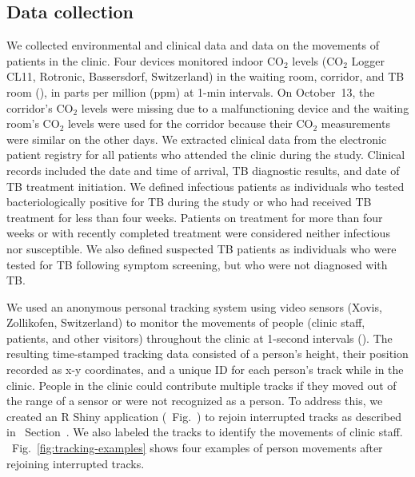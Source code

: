 \documentclass[fleqn,11pt]{wlscirep}
\begin{document}
\subsection*{Data collection}

We collected environmental and clinical data and data on the movements of patients in the clinic. Four devices monitored indoor CO$_2$ levels (CO$_2$ Logger CL11, Rotronic, Bassersdorf, Switzerland) in the waiting room, corridor, and TB room (), in parts per million (ppm) at 1-min intervals. On October~13, the corridor's CO$_2$ levels were missing due to a malfunctioning device and the waiting room's CO$_2$ levels were used for the corridor because their CO$_2$ measurements were similar on the other days.    
We extracted clinical data from the electronic patient registry for all patients who attended the clinic during the study. Clinical records included the date and time of arrival, TB diagnostic results, and date of TB treatment initiation. We defined infectious patients as individuals who tested bacteriologically positive for TB during the study or who had received TB treatment for less than four weeks. Patients on treatment for more than four weeks or with recently completed treatment were considered neither infectious nor susceptible. We also defined suspected TB patients as individuals who were tested for TB following symptom screening, but who were not diagnosed with TB. 

We used an anonymous personal tracking system using video sensors (Xovis, Zollikofen, Switzerland) to monitor the movements of people (clinic staff, patients, and other visitors) throughout the clinic at 1-second intervals (). The resulting time-stamped tracking data consisted of a person’s height, their position recorded as x-y coordinates, and a unique ID for each person's track while in the clinic. People in the clinic could contribute multiple tracks if they moved out of the range of a sensor or were not recognized as a person. To address this, we created an R Shiny application (\supp~Fig.~) to rejoin interrupted tracks as described in \supp~Section~. We also labeled the tracks to identify the movements of clinic staff. \supp~Fig.~\ref{fig:tracking-examples} shows four examples of person movements after rejoining interrupted tracks.  
\end{document}
